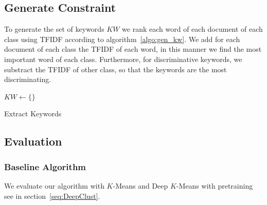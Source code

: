 \subsection{Generate Constraint}
To generate the set of keywords $KW$ we rank each word of each 
document of each class using TFIDF according to algorithm~\ref{algo:gen_kw}.
We add for each document of each class the TFIDF of each word, in this manner
we find the most important word of each class. Furthermore, for discriminative keywords,
we substract  the TFIDF of other class, so that the keywords are the most discriminating.
\begin{algorithm}
  $KW \gets \{\}$\\
  \caption{\label{algo:gen_kw}Extract Keywords}
\end{algorithm}
\subsection{Evaluation}
\subsubsection{Baseline Algorithm}
We evaluate our algorithm with $K$-Means and Deep $K$-Means with pretraining 
see in section~\ref{seq:DeepClust}.
